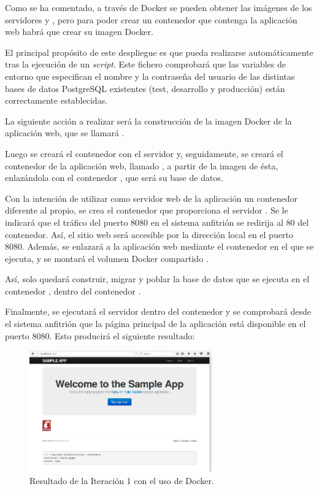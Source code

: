 Como se ha comentado, a través de Docker se pueden obtener las imágenes de los servidores  y , pero para poder crear un contenedor que contenga la aplicación web habrá que crear su imagen Docker. 

El principal propósito de este despliegue es que pueda realizarse automáticamente tras la ejecución de un \textit{script}. Este fichero comprobará que las variables de entorno que especifican el nombre y la contraseña del usuario de las distintas bases de datos PostgreSQL existentes (test, desarrollo y producción) están correctamente establecidas.

La siguiente acción a realizar será la construcción de la imagen Docker de la aplicación web, que se llamará . 

Luego se creará el contenedor  con el servidor  y, seguidamente, se creará el contenedor de la aplicación web, llamado , a partir de la imagen de ésta, enlazándola con el contenedor , que será su base de datos.

Con la intención de utilizar como servidor web de la aplicación un contenedor diferente al propio, se crea el contenedor  que proporciona el servidor . Se le indicará que el tráfico del puerto 8080 en el sistema anfitrión se redirija al 80 del contenedor. Así, el sitio web será accesible por la dirección local en el puerto 8080. Además, se enlazará a la aplicación web mediante el contenedor en el que se ejecuta, y se montará el volumen Docker compartido .

Así, solo quedará construir, migrar y poblar la base de datos que se ejecuta en el contenedor , dentro del contenedor .

Finalmente, se ejecutará el servidor  dentro del contenedor  y se comprobará desde el sistema anfitrión que la página principal de la aplicación  está disponible en el puerto 8080. Esto producirá el siguiente resultado:

\begin{figure}[H]
\centering
\includegraphics[width=0.7\textwidth]{images/figures/resultado1.png}
\caption{Resultado de la Iteración 1 con el uso de Docker.}
\end{figure}

